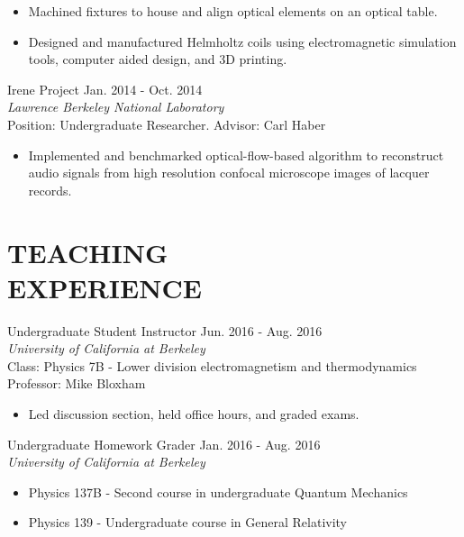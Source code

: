 \documentclass[margin, 10pt]{res} %
\begin{document}
\begin{resume}
\begin{itemize}
\item {\normalfont Machined fixtures to house and align optical elements on an optical table.}
\item {\normalfont Designed and manufactured Helmholtz coils using electromagnetic simulation tools, computer aided design, and 3D printing. }
\end{itemize}

Irene Project \hfill Jan. 2014 - Oct. 2014\\ {\sl Lawrence Berkeley National Laboratory} \\
{\normalfont Position: Undergraduate Researcher. Advisor: Carl Haber}

\begin{itemize}
\item {\normalfont Implemented and benchmarked optical-flow-based algorithm to reconstruct audio signals from high resolution confocal microscope images of lacquer records.}
\end{itemize}


\section{TEACHING \\ EXPERIENCE}
Undergraduate Student Instructor \hfill Jun. 2016 - Aug. 2016\\
{\sl University of California at Berkeley} \\
{\normalfont Class: Physics 7B - Lower division electromagnetism and thermodynamics}\\
{\normalfont Professor: Mike Bloxham}

\begin{itemize}
\item {\normalfont Led discussion section, held office hours, and graded exams.}
\end{itemize}

Undergraduate Homework Grader \hfill Jan. 2016 - Aug. 2016\\
{\sl University of California at Berkeley}
\begin{itemize}
\item {\normalfont Physics 137B - Second course in undergraduate Quantum Mechanics}
\item {\normalfont Physics 139 - Undergraduate course in General Relativity}
\end{itemize}


\end{resume}
\end{document}
